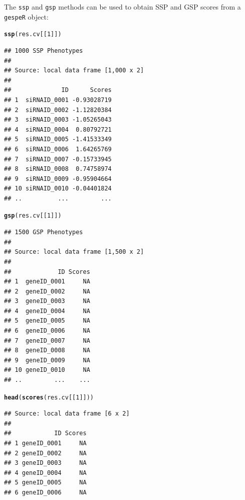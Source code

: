 \documentclass{article}\usepackage[]{graphicx}\usepackage[]{color}
\makeatletter
\newcommand{\hlnum}[1]{\textcolor[rgb]{0.686,0.059,0.569}{#1}}%
\newcommand{\hlstd}[1]{\textcolor[rgb]{0.345,0.345,0.345}{#1}}%
\newcommand{\hlkwd}[1]{\textcolor[rgb]{0.737,0.353,0.396}{\textbf{#1}}}%
\newenvironment{kframe}{%
 \def\at@end@of@kframe{}%
 \ifinner\ifhmode%
  \def\at@end@of@kframe{\end{minipage}}%
  \begin{minipage}{\columnwidth}%
 \fi\fi%
 \def\FrameCommand##1{\hskip\@totalleftmargin \hskip-\fboxsep
 \colorbox{shadecolor}{##1}\hskip-\fboxsep
     \hskip-\linewidth \hskip-\@totalleftmargin \hskip\columnwidth}%
 \MakeFramed {\advance\hsize-\width
   \@totalleftmargin\z@ \linewidth\hsize
   \@setminipage}}%
 {\par\unskip\endMakeFramed%
 \at@end@of@kframe}
\newenvironment{knitrout}{}{} %
\makeatother
\begin{document}
The \texttt{ssp} and \texttt{gsp} methods can be used to obtain SSP and GSP scores from a \texttt{gespeR} object:
\begin{knitrout}
\color{fgcolor}\begin{kframe}
\begin{alltt}
  \hlkwd{ssp}\hlstd{(res.cv[[}\hlnum{1}\hlstd{]])}
\end{alltt}
\begin{verbatim}
## 1000 SSP Phenotypes
## 
## Source: local data frame [1,000 x 2]
## 
##              ID      Scores
## 1  siRNAID_0001 -0.93028719
## 2  siRNAID_0002 -1.12820384
## 3  siRNAID_0003 -1.05265043
## 4  siRNAID_0004  0.80792721
## 5  siRNAID_0005 -1.41533349
## 6  siRNAID_0006  1.64265769
## 7  siRNAID_0007 -0.15733945
## 8  siRNAID_0008  0.74758974
## 9  siRNAID_0009 -0.95904664
## 10 siRNAID_0010 -0.04401824
## ..          ...         ...
\end{verbatim}
\begin{alltt}
  \hlkwd{gsp}\hlstd{(res.cv[[}\hlnum{1}\hlstd{]])}
\end{alltt}
\begin{verbatim}
## 1500 GSP Phenotypes
## 
## Source: local data frame [1,500 x 2]
## 
##             ID Scores
## 1  geneID_0001     NA
## 2  geneID_0002     NA
## 3  geneID_0003     NA
## 4  geneID_0004     NA
## 5  geneID_0005     NA
## 6  geneID_0006     NA
## 7  geneID_0007     NA
## 8  geneID_0008     NA
## 9  geneID_0009     NA
## 10 geneID_0010     NA
## ..         ...    ...
\end{verbatim}
\begin{alltt}
  \hlkwd{head}\hlstd{(}\hlkwd{scores}\hlstd{(res.cv[[}\hlnum{1}\hlstd{]]))}
\end{alltt}
\begin{verbatim}
## Source: local data frame [6 x 2]
## 
##            ID Scores
## 1 geneID_0001     NA
## 2 geneID_0002     NA
## 3 geneID_0003     NA
## 4 geneID_0004     NA
## 5 geneID_0005     NA
## 6 geneID_0006     NA
\end{verbatim}
\end{kframe}
\end{knitrout}
\end{document}
